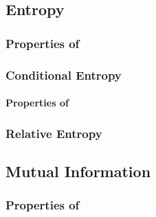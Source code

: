 \subsection{Entropy}\label{subsec:Entropy}
\subsubsection{Properties of }\label{subsubsec:Entropy_Properties}

\subsubsection{Conditional Entropy}\label{subsubsec:Conditional_Entropy}
\paragraph{Properties of }\label{par:Conditional_Entropy_Properties}

\subsubsection{Relative Entropy}\label{subsubsec:Relative_Entropy}

\subsection{Mutual Information}\label{subsec:Mutual_Information}
\subsubsection{Properties of }\label{subsubsec:Mutual_Information_Properties}
